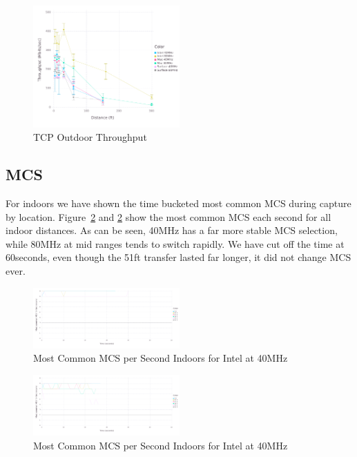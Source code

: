 \begin{figure}[!h]
\centering
\includegraphics[width=0.5\textwidth]{figures/allchip_Outside_TCP_Throughput}
\caption{TCP Outdoor Throughput}
\label{fig:outsidethru}
\end{figure}

\subsection{MCS}
For indoors we have shown the time bucketed most common MCS during
capture by location. Figure~\ref{fig:imcs40time} and
\ref{fig:imcs40time} show the most common MCS each second for all
indoor distances. As can be seen, 40MHz has a far more stable MCS
selection, while 80MHz at mid ranges tends to switch rapidly.  We have
cut off the time at 60seconds, even though the 51ft transfer lasted
far longer, it did not change MCS ever.
\begin{figure}[!h]
\centering
\includegraphics[width=0.5\textwidth]{figures/Intel_Inside_40_MCS}
\caption{Most Common MCS per Second Indoors for Intel at 40MHz}
\label{fig:imcs40time}
\end{figure}

\begin{figure}[!h]
\centering
\includegraphics[width=0.5\textwidth]{figures/Intel_Inside_80_MCS}
\caption{Most Common MCS per Second Indoors for Intel at 40MHz}
\label{fig:imcs80time}
\end{figure}
